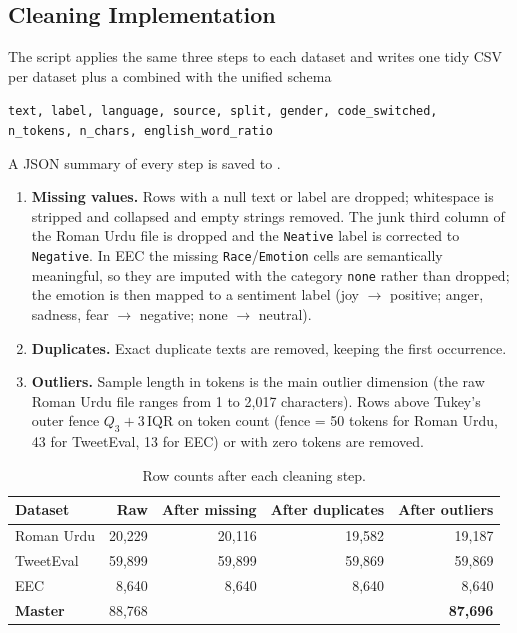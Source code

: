 \documentclass[11pt,a4paper]{article}
\begin{document}
\subsection{Cleaning Implementation}
The script  applies the same three steps to each dataset and
writes one tidy CSV per dataset plus a combined  with the unified
schema
\begin{center}
\small\texttt{text, label, language, source, split, gender, code\_switched,}\\
\small\texttt{n\_tokens, n\_chars, english\_word\_ratio}
\end{center}
A JSON summary of every step is saved to .

\begin{enumerate}
  \item \textbf{Missing values.} Rows with a null text or label are dropped; whitespace is
        stripped and collapsed and empty strings removed. The junk third column of the Roman
        Urdu file is dropped and the \texttt{Neative} label is corrected to \texttt{Negative}.
        In EEC the missing \texttt{Race}/\texttt{Emotion} cells are semantically meaningful, so
        they are imputed with the category \texttt{none} rather than dropped; the emotion is then
        mapped to a sentiment label (joy $\to$ positive; anger, sadness, fear $\to$ negative;
        none $\to$ neutral).
  \item \textbf{Duplicates.} Exact duplicate texts are removed, keeping the first occurrence.
  \item \textbf{Outliers.} Sample length in tokens is the main outlier dimension (the raw Roman
        Urdu file ranges from 1 to 2,017 characters). Rows above Tukey's outer fence
        $Q_3 + 3\,\mathrm{IQR}$ on token count (fence = 50 tokens for Roman Urdu, 43 for
        TweetEval, 13 for EEC) or with zero tokens are removed.
\end{enumerate}

\begin{table}[H]
\centering
\begin{tabular}{lrrrr}
\toprule
\textbf{Dataset} & \textbf{Raw} & \textbf{After missing} & \textbf{After duplicates} & \textbf{After outliers} \\
\midrule
Roman Urdu & 20,229 & 20,116 & 19,582 & 19,187 \\
TweetEval  & 59,899 & 59,899 & 59,869 & 59,869 \\
EEC        & 8,640  & 8,640  & 8,640  & 8,640 \\
\midrule
\textbf{Master} & 88,768 & & & \textbf{87,696} \\
\bottomrule
\end{tabular}
\caption{Row counts after each cleaning step.}
\label{tab:cleaning}
\end{table}
\end{document}
